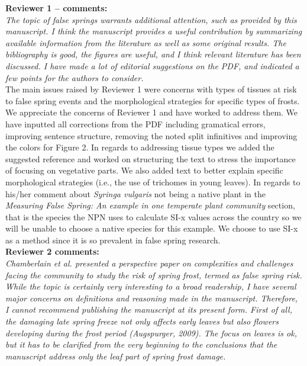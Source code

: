 \documentclass[11pt,a4paper]{article}
\begin{document}


\textbf {Reviewer 1 -- comments:} \\

\textit{The topic of false springs warrants additional attention, such as provided by this manuscript. I think the manuscript provides a useful contribution by summarizing available information from the literature as well as some original results. The bibliography is good, the figures are useful, and I think relevant literature has been discussed. I have made a lot of editorial suggestions on the PDF, and indicated a few points for the authors to consider.}\\

The main issues raised by Reviewer 1 were concerns with types of tissues at risk to false spring events and the morphological strategies for specific types of frosts.\\

We appreciate the concerns of Reviewer 1 and have worked to address them. We have inputted all corrections from the PDF including gramatical errors, improving sentence structure, removing the noted split infinitives and improving the colors for Figure 2. In regards to addressing tissue types we added the suggested reference and worked on structuring the text to stress the importance of focusing on vegetative parts. We also added text to better explain specific morphological strategies (i.e., the use of trichomes in young leaves). In regards to his/her comment about \textit{Syringa vulgaris} not being a native plant in the \textit{Measuring False Spring: An example in one temperate plant community} section, that is the species the NPN uses to calculate SI-x values across the country so we will be unable to choose a native species for this example. We choose to use SI-x as a method since it is so prevalent in false spring research.  \\

\textbf {Reviewer 2 comments:} \\

\textit{Chamberlain et al. presented a perspective paper on complexities and challenges facing the community to study the risk of spring frost, termed as false spring risk. While the topic is certainly very interesting to a broad readership, I have several major concerns on definitions and reasoning made in the manuscript. Therefore, I cannot recommend publishing the manuscript at its present form. First of all, the damaging late spring freeze not only affects early leaves but also flowers developing during the frost period (Augspurger, 2009). The focus on leaves is ok, but it has to be clarified from the very beginning to the conclusions that the manuscript address only the leaf part of spring frost damage.}\\
\end{document}
